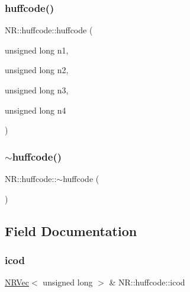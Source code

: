 \mbox{\label{classNR_1_1huffcode_adf21f7c173d14b46a90ca8295cfc61fd}} 
\subsubsection{\texorpdfstring{huffcode()}{huffcode()}\hspace{0.1cm}{\footnotesize\ttfamily [3/3]}}
{\footnotesize\ttfamily N\+R\+::huffcode\+::huffcode (\begin{DoxyParamCaption}\item[{unsigned long}]{n1,  }\item[{unsigned long}]{n2,  }\item[{unsigned long}]{n3,  }\item[{unsigned long}]{n4 }\end{DoxyParamCaption})\hspace{0.3cm}{\ttfamily [inline]}}

\mbox{\label{classNR_1_1huffcode_a414a1322987c65cead6e5a0b20727f0f}} 
\subsubsection{\texorpdfstring{$\sim$huffcode()}{~huffcode()}\hspace{0.1cm}{\footnotesize\ttfamily [3/3]}}
{\footnotesize\ttfamily N\+R\+::huffcode\+::$\sim$huffcode (\begin{DoxyParamCaption}{ }\end{DoxyParamCaption})\hspace{0.3cm}{\ttfamily [inline]}}



\subsection{Field Documentation}
\mbox{\label{classNR_1_1huffcode_ad0de07752f40849b79f1e8ba6a23599d}} 
\subsubsection{\texorpdfstring{icod}{icod}}
{\footnotesize\ttfamily \mbox{\hyperlink{classNR_1_1NRVec}{N\+R\+Vec}}$<$ unsigned long $>$ \& N\+R\+::huffcode\+::icod}

